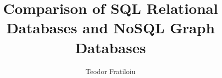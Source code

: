 \documentclass[10pt,        %
               a4paper,     %
               journal,     %
               ]{IEEEtran}
\makeatletter
\def\markboth#1#2{\def\leftmark{\@IEEEcompsoconly{\sffamily}\MakeUppercase{\protect#1}}%
\def\rightmark{\@IEEEcompsoconly{\sffamily}\MakeUppercase{\protect#2}}}
\makeatother
\begin{document}
\title{Comparison of SQL Relational Databases and NoSQL Graph Databases}
%

\author{Teodor Fratiloiu}%

% 
%

\markboth{Scientific Seminar - Security in Information Technology, Winter Term 2020}%
{Teodor Fratiloiu: Comparison of SQL Relational Databases and NoSQL Graph Databases}

% 
\end{document}
